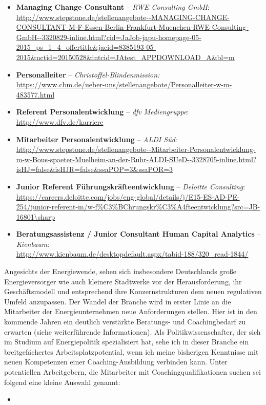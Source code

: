 \documentclass[11pt,a4paper]{article}
\begin{document}
\begin{itemize}

\item \textbf{Managing Change Consultant} -- \textsl{RWE Consulting GmbH}:\\ \textsf{\textcolor{MidnightBlue}{\url{http://www.stepstone.de/stellenangebote--MANAGING-CHANGE-CONSULTANT-M-F-Essen-Berlin-Frankfurt-Muenchen-RWE-Consulting-GmbH--3320829-inline.html?cid=JaJob-japu-homepage-05-2015_ps_1_4_offertitle&jacid=8385193-05-2015&nctid=20150528&intcid=JAtest_APPDOWNLOAD_A&bl=m}}}

\item \textbf{Personalleiter} -- \textsl{Christoffel-Blindenmission:}\\
\textsf{\textcolor{MidnightBlue}{\url{https://www.cbm.de/ueber-uns/stellenangebote/Personalleiter-w-m-483577.html}}}

\item \textbf{Referent Personalentwicklung} -- \textsl{dfv Mediengruppe}:\\
\textsf{\textcolor{MidnightBlue}{\url{http://www.dfv.de/karriere}}}

\item \textbf{Mitarbeiter Personalentwicklung} -- \textsl{ALDI Süd}:\\
\textsf{\textcolor{MidnightBlue}{\url{http://www.stepstone.de/stellenangebote--Mitarbeiter-Personalentwicklung-m-w-Bous-spaeter-Muelheim-an-der-Ruhr-ALDI-SUeD--3328705-inline.html?isHJ=false\&isHJR=false&ssaPOP=3\&ssaPOR=3}}}

\item \textbf{Junior Referent Führungskräfteentwicklung} -- \textsl{Deloitte Consulting}:\\
\textsf{\textcolor{MidnightBlue}{\url{https://careers.deloitte.com/jobs/eng-global/details/j/E15-ES-AD-PE-254/junior-referent-m/w-f\%C3\%BChrungskr\%C3\%A4fteentwicklung?src=JB-16801\sharp}}}

\item \textbf{Beratungsassistenz / Junior Consultant Human Capital Analytics} -- \textsl{Kienbaum}:\\
\textsf{\textcolor{MidnightBlue}{\url{http://www.kienbaum.de/desktopdefault.aspx/tabid-188/320_read-1844/}}}

\end{itemize}


Angesichts der Energiewende, sehen sich insbesondere Deutschlands große Energieversorger wie auch kleinere Stadtwerke vor der Herausforderung, ihr Geschäftsmodell und entsprechend ihre Konzernstrukturen dem neuen regulativen Umfeld anzupassen. Der Wandel der Branche wird in erster Linie an die Mitarbeiter der Energieunternehmen neue Anforderungen stellen. Hier ist in den kommende Jahren ein deutlich verstärkte Beratungs- und Coachingbedarf zu erwarten (siehe weiterführende Informationen). Als Politikwissenschafter, der sich im Studium auf Energiepolitik spezialisiert hat, sehe ich in dieser Branche ein breitgefächertes Arbeitsplatzpotential, wenn ich meine bisherigen Kenntnisse mit neuen Kompetenzen einer Coaching-Ausbildung verbinden kann. Unter potentiellen Arbeitgebern, die Mitarbeiter mit Coachingqualifikationen suchen sei folgend eine kleine Auswahl genannt:

	\begin{itemize}
	\item 
	\end{itemize}
\end{document}
